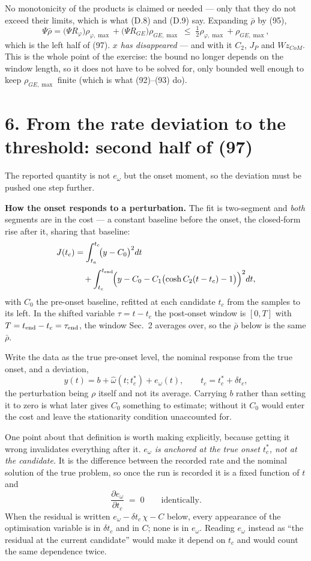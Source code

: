 \documentclass[11pt]{article}
\newcommand{\Wz}{W\!z_{CoM}}
\newcommand{\te}{\tau_{\rm end}}
\newcommand{\rbar}{\bar\rho}
\begin{document}
No monotonicity of the products is claimed or needed --- only that they
do not exceed their limits, which is what (D.8) and (D.9) say.
Expanding $\rbar$ by (95),
\[
  \Psi\rbar = \bigl(\Psi R_\varphi\bigr)\rho_{\varphi,\max}
            + \bigl(\Psi R_{GE}\bigr)\rho_{GE,\max}
            \;\le\; \tfrac12\rho_{\varphi,\max} + \rho_{GE,\max},
\]
which is the left half of (97). \emph{$x$ has disappeared} --- and with
it $C_2$, $J_P$ and $\Wz$. This is the whole point of the exercise: the
bound no longer depends on the window length, so it does not have to be
solved for, only bounded well enough to keep $\rho_{GE,\max}$ finite
(which is what (92)--(93) do).

\section*{6. From the rate deviation to the threshold: second half of (97)}

The reported quantity is not $e_\omega$ but the onset moment, so the
deviation must be pushed one step further.

\textbf{How the onset responds to a perturbation.} The fit is
two-segment and \emph{both} segments are in the cost --- a constant
baseline before the onset, the closed-form rise after it, sharing that
baseline:
\begin{align*}
  J(t_c) &= \int_{t_a}^{t_c}\!\bigl(y - C_0\bigr)^2dt \\[2pt]
   &\quad+ \int_{t_c}^{t_{\rm end}}\!
     \Bigl(y - C_0 - C_1\bigl(\cosh C_2(t-t_c) - 1\bigr)\Bigr)^2dt ,
\end{align*}
with $C_0$ the pre-onset baseline, refitted at each candidate $t_c$
from the samples to its left. In the shifted variable $\tau = t - t_c$
the post-onset window is $[0,T]$ with $T = t_{\rm end}-t_c = \te$, the
window Sec.~2 averages over, so the $\rbar$ below is the same $\rbar$.

Write the data as the true pre-onset level, the nominal response from
the true onset, and a deviation,
\[
  y(t) = b + \hat\omega(t;t_c^*) + e_\omega(t),
  \qquad
  t_c = t_c^* + \delta t_c ,
\]
the perturbation being $\rho$ itself and not its average. Carrying $b$
rather than setting it to zero is what later gives $C_0$ something to
estimate; without it $C_0$ would enter the cost and leave the
stationarity condition unaccounted for.

One point about that definition is worth making explicitly, because
getting it wrong invalidates everything after it. \emph{$e_\omega$ is
anchored at the true onset $t_c^*$, not at the candidate.} It is the
difference between the recorded rate and the nominal solution of the
true problem, so once the run is recorded it is a fixed function of $t$
and
\[
  \frac{\partial e_\omega}{\partial t_c} \;=\; 0
  \qquad\text{identically.}
\]
When the residual is written $e_\omega - \delta t_c\,\chi - C$ below,
every appearance of the optimisation variable is in $\delta t_c$ and in
$C$; none is in $e_\omega$. Reading $e_\omega$ instead as ``the residual
at the current candidate'' would make it depend on $t_c$ and would
count the same dependence twice.
\end{document}
